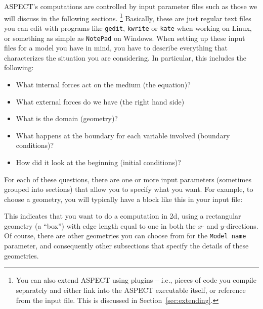 \documentclass{article}
\newcommand{\aspect}{\textsc{ASPECT}}
\begin{document}
\aspect{}'s computations are controlled by input parameter files such as those
we will discuss in the following sections.%
\footnote{You can also extend \aspect{} using plugins -- i.e., pieces of code
you compile separately and either link into the \aspect{} executable itself, or
reference from the input file. This is discussed in
Section~\ref{sec:extending}.}
Basically, these are just regular text files you can edit with programs like
\texttt{gedit}, \texttt{kwrite} or \texttt{kate} when working on Linux, or
something as simple as \texttt{NotePad} on Windows. When setting up these input
files for a model you have in mind, you have to describe everything
that characterizes the situation you are considering. In particular,
this includes the following:
\begin{itemize}
  \item What internal forces act on the medium (the equation)?
  \item What external forces do we have (the right hand side)
  \item What is the domain (geometry)?
  \item What happens at the boundary for each variable involved (boundary
 conditions)?
  \item How did it look at the beginning (initial conditions)?
\end{itemize}
For each of these questions, there are one or more input parameters (sometimes
grouped into sections) that allow you to specify what you want. For example, to
choose a geometry, you will typically have a block like this in your input file:
%

%
This indicates that you want to do a computation in 2d, using a rectangular
geometry (a ``box'') with edge length equal to one in both the $x$- and
$y$-directions. Of course, there are other geometries you can choose from for
the \texttt{Model name} parameter, and consequently other subsections that
specify the details of these geometries.
\end{document}

